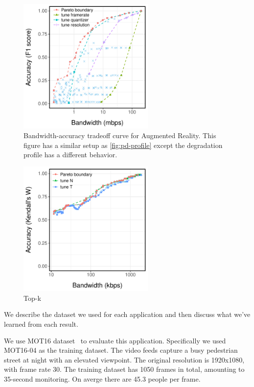 \begin{figure}
  \centering
  \includegraphics[width=0.6\textwidth]{figures/darknet-profile.pdf}
  \caption{Bandwidth-accuracy tradeoff curve for Augmented Reality. This figure
    has a similar setup as \autoref{fig:pd-profile} except the degradation
    profile has a different behavior.}
  \label{fig:ar-profile}
\end{figure}

\begin{figure}
  \centering
  \includegraphics[width=0.6\textwidth]{figures/log-profile.pdf}
  \caption{Top-k}
  \label{fig:tk-profile}
\end{figure}

We describe the dataset we used for each application and then discuss what we've
learned from each result.

 We use MOT16 dataset~\cite{milan2016mot16} to
evaluate this application. Specifically we used MOT16-04 as the training
dataset. The video feeds capture a busy pedestrian street at night with an
elevated viewpoint. The original resolution is 1920x1080, with frame rate
30. The training dataset has 1050 frames in total, amounting to 35-second
monitoring. On averge there are 45.3 people per frame.

